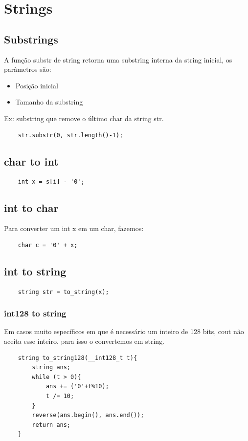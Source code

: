\section{Strings}

\subsection{Substrings}

\par A função substr de string retorna uma substring interna da string inicial, os parâmetros são:
\begin{itemize}
    \item Posição inicial
    \item Tamanho da substring
\end{itemize}
\par Ex: substring que remove o último char da string str.
\begin{verbatim}
    str.substr(0, str.length()-1);
\end{verbatim}

\subsection{char to int}
\begin{verbatim}
    int x = s[i] - '0';
\end{verbatim}

\subsection{int to char}
\par Para converter um int x em um char, fazemos:
\begin{verbatim}
    char c = '0' + x;
\end{verbatim}

\subsection{int to string}
\begin{verbatim}
    string str = to_string(x);
\end{verbatim}

\subsubsection{int128 to string}
Em casos muito específicos em que é necessário um inteiro de 128 bits, cout não aceita esse inteiro, para isso o convertemos em string.
\begin{verbatim}
    string to_string128(__int128_t t){
        string ans;
        while (t > 0){
            ans += ('0'+t%10);
            t /= 10;
        }
        reverse(ans.begin(), ans.end());
        return ans;
    }
\end{verbatim}


